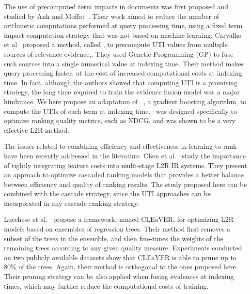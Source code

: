 \documentclass[preprint,review,10pt,3p]{elsarticle}
\begin{document}
The use of precomputed term impacts in documents was first proposed and studied by Anh and Moffat~\cite{Anh:2002:ITE:564376.564380}.
Their work aimed to reduce the number of arithmetic computations performed at query processing time, using a fixed term impact computation strategy that was not based on machine learning. Carvalho et al~\cite{costa2012lepref} proposed a method, called \lepref, to precompute UTI values from multiple sources of relevance evidence,. They used Genetic Programming (GP)
 to fuse such sources into a single numerical value at indexing time.
Their method makes query processing faster, at the cost of increased computational costs at indexing time. In fact, although the authors showed that computing UTI is a promising strategy, the long time required to train the evidence fusion model was a major hindrance. We here propose an adaptation of \lambdamart~\cite{wu2010lambdamart}, a gradient boosting algorithm, to compute the UTIs of each term at indexing time. \lambdamart\ was designed specifically to optimize ranking quality metrics, such as NDCG, and was shown to be a very effective L2R method. 

The issues related to combining efficiency and effectiveness in learning to rank have been recently addressed in the literature. Chen et al.~\cite{Chen2017} study  the importance of tightly integrating feature costs into multi-stage L2R IR systems. They present an approach to optimize cascaded ranking models that provides a better balance between efficiency and quality of ranking results.  The study proposed here can be combined with the cascade strategy, since the UTI approaches can be incorporated in any cascade ranking strategy.

Lucchese et al.~\cite{Lucchese2016}  propose a  framework, named CLEaVER, for optimizing L2R models based on ensembles of regression trees.  Their method first removes a subset of the trees in the ensemble, and then fine-tunes the weights of the remaining trees according to any given quality measure. Experiments conducted on two publicly available  datasets show that CLEaVER is able to prune up to 80\% of the trees. Again, their method is orthogonal to the ones proposed here. Their pruning strategy can be also applied when fusing evidences at indexing times, which may further reduce the computational costs of training. 
\end{document}
